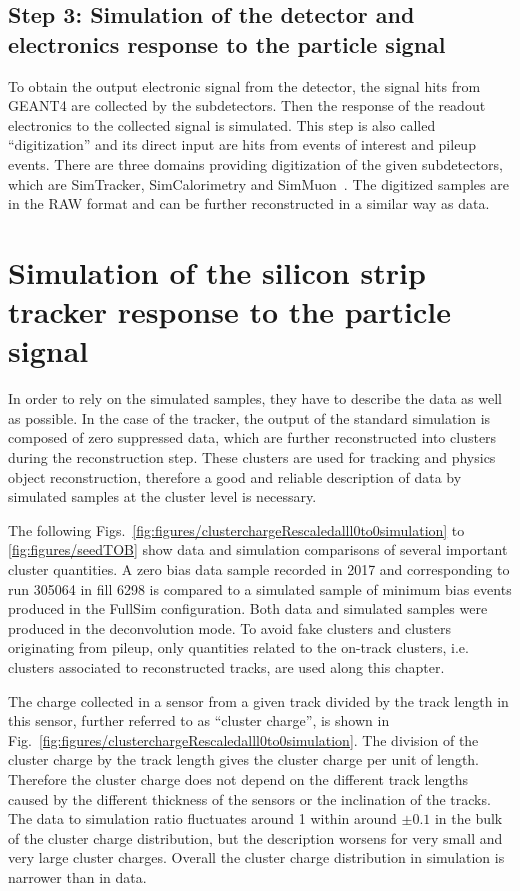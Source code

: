 \subsection{Step 3: Simulation of the detector and electronics response to the particle signal}

To obtain the output electronic signal from the detector, the signal hits from GEANT4 are collected by the subdetectors. Then the response of the readout electronics to the collected signal is simulated. This step is also called ``digitization'' and its direct input are hits from events of interest and pileup events. There are three domains providing digitization of the given subdetectors, which are SimTracker, SimCalorimetry and SimMuon~\cite{website:simdigi}. The digitized samples are in the RAW format and can be further reconstructed in a similar way as data.


\section{Simulation of the silicon strip tracker response to the particle signal~\label{sec:trackerSimu}}

In order to rely on the simulated samples, they have to describe the data as well as possible. In the case of the tracker, the output of the standard simulation is composed of zero suppressed data, which are further reconstructed into clusters during the reconstruction step. These clusters are used for tracking and physics object reconstruction, therefore a good and reliable description of data by simulated samples at the cluster level is necessary.

The following Figs.~\ref{fig:figures/clusterchargeRescaledalll0to0simulation} to \ref{fig:figures/seedTOB} show data and simulation comparisons of several important cluster quantities. A zero bias data sample recorded in 2017 and corresponding to run 305064 in fill 6298 is compared to a simulated sample of minimum bias events produced in the FullSim configuration. Both data and simulated samples were produced in the deconvolution mode. To avoid fake clusters and clusters originating from pileup, only quantities related to the on-track clusters, i.e. clusters associated to reconstructed tracks, are used along this chapter.
 
The charge collected in a sensor from a given track divided by the track length in this sensor, further referred to as ``cluster charge'', is shown in Fig.~\ref{fig:figures/clusterchargeRescaledalll0to0simulation}. The division of the cluster charge by the track length gives the cluster charge per unit of length. Therefore the cluster charge does not depend on the different track lengths caused by the different thickness of the sensors or the inclination of the tracks.  The data to simulation ratio fluctuates around 1 within around $\pm 0.1$ in the bulk of the cluster charge distribution, but the description worsens for very small and very large cluster charges. Overall the cluster charge distribution in simulation is narrower than in data. 


